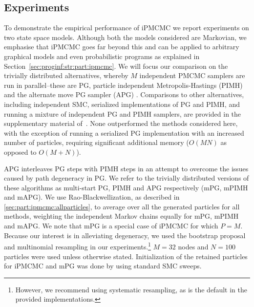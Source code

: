 
\subsection{Experiments}
\label{sec:experiments}

To demonstrate the %
empirical performance of iPMCMC we report experiments on two state space models.  
Although both the models considered are Markovian, we emphasise that iPMCMC goes far beyond this and can be applied to arbitrary graphical models
and even probabilistic programs as explained in Section~\ref{sec:proginf:str:part:ipmcmc}. 
We will focus our comparison on the trivially distributed alternatives, whereby $M$ independent PMCMC samplers are run in parallel--these are PG, particle independent Metropolis-Hastings (PIMH) \citep{andrieuDH2010} and the alternate move PG sampler (APG) \citep{holenstein2009particle}. Comparisons to other alternatives, including independent SMC, serialized implementations of PG and PIMH, and running a mixture of independent PG and PIMH samplers, are provided in the supplementary material of~\cite{rainforth2016interacting}.  
None outperformed the methods considered here, with the exception of running a serialized PG implementation with an increased number of particles, requiring significant additional memory ($O(MN)$ as opposed to $O(M+N)$).

APG interleaves PG steps with PIMH steps
in an attempt to overcome the issues caused by path degeneracy in PG.  We refer to the trivially distributed versions of these algorithms as multi-start PG, PIMH and APG respectively (mPG, mPIMH and mAPG). 
We use Rao-Blackwellization, as described in \ref{sec:part:ipmcmc:allparticles}, to average over all the generated particles for all methods, weighting the independent Markov chains equally for mPG, mPIMH and mAPG. We note that mPG is a special case of iPMCMC for which $P=M$.  Because our interest is in alleviating degeneracy, we used the bootstrap proposal and multinomial resampling in our experiments.\footnote{However, we recommend
	using systematic resampling, as is the default in the provided implementations.}
 $M=32$ nodes and $N=100$ particles were used unless otherwise stated.  Initialization of the retained particles for iPMCMC and mPG was done by using standard SMC sweeps.

